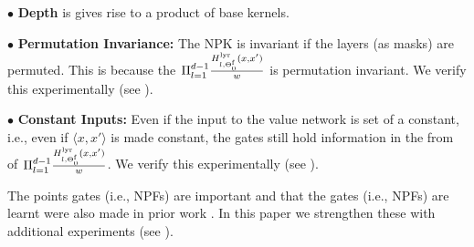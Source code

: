 $\bullet$ \textbf{Depth} is gives rise to a product of base kernels. 

$\bullet$ \textbf{Permutation Invariance:} The NPK is invariant if the layers (as masks) are permuted. This is because the $\Pi_{l=1}^{d-1} \frac{H^{\text{lyr}}_{l,\Theta^{\textrm{f}}_0}(x,x')}{w}$ is permutation invariant. We verify this experimentally (see ).

$\bullet$ \textbf{Constant Inputs:} Even if the input to the value network is set of a constant, i.e., even if $\langle x,x'\rangle$ is made constant, the gates still hold information in the from of $\Pi_{l=1}^{d-1} \frac{H^{\text{lyr}}_{l,\Theta^{\textrm{f}}_0}(x,x')}{w}$. We verify this experimentally (see ).

The points gates (i.e., NPFs) are important and that the gates (i.e., NPFs) are learnt were also made in prior work \cite{npk}. In this paper we strengthen these with additional experiments (see ).


